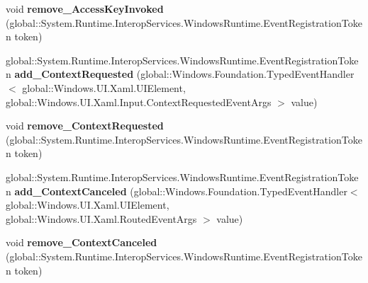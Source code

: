 \begin{DoxyCompactItemize}
\item 
\mbox{\label{interface_windows_1_1_u_i_1_1_xaml_1_1_i_u_i_element4_ae34bf72d8d0d7a9d33ede980ae1b29db}} 
void {\bfseries remove\+\_\+\+Access\+Key\+Invoked} (global\+::\+System.\+Runtime.\+Interop\+Services.\+Windows\+Runtime.\+Event\+Registration\+Token token)
\item 
\mbox{\label{interface_windows_1_1_u_i_1_1_xaml_1_1_i_u_i_element4_abe904f042597f814b0e82b6911018524}} 
global\+::\+System.\+Runtime.\+Interop\+Services.\+Windows\+Runtime.\+Event\+Registration\+Token {\bfseries add\+\_\+\+Context\+Requested} (global\+::\+Windows.\+Foundation.\+Typed\+Event\+Handler$<$ global\+::\+Windows.\+U\+I.\+Xaml.\+U\+I\+Element, global\+::\+Windows.\+U\+I.\+Xaml.\+Input.\+Context\+Requested\+Event\+Args $>$ value)
\item 
\mbox{\label{interface_windows_1_1_u_i_1_1_xaml_1_1_i_u_i_element4_abdaa8213b321663c768808ee50570eb8}} 
void {\bfseries remove\+\_\+\+Context\+Requested} (global\+::\+System.\+Runtime.\+Interop\+Services.\+Windows\+Runtime.\+Event\+Registration\+Token token)
\item 
\mbox{\label{interface_windows_1_1_u_i_1_1_xaml_1_1_i_u_i_element4_a9ade4191c6e4d4e8692b363604d2e6cf}} 
global\+::\+System.\+Runtime.\+Interop\+Services.\+Windows\+Runtime.\+Event\+Registration\+Token {\bfseries add\+\_\+\+Context\+Canceled} (global\+::\+Windows.\+Foundation.\+Typed\+Event\+Handler$<$ global\+::\+Windows.\+U\+I.\+Xaml.\+U\+I\+Element, global\+::\+Windows.\+U\+I.\+Xaml.\+Routed\+Event\+Args $>$ value)
\item 
\mbox{\label{interface_windows_1_1_u_i_1_1_xaml_1_1_i_u_i_element4_ac9d7657d497cc4bd420335a23752824f}} 
void {\bfseries remove\+\_\+\+Context\+Canceled} (global\+::\+System.\+Runtime.\+Interop\+Services.\+Windows\+Runtime.\+Event\+Registration\+Token token)
\item 
\mbox{\label{interface_windows_1_1_u_i_1_1_xaml_1_1_i_u_i_element4_a35fc44f1af8aacfcb2a3ff829fcb7d50}} 

\end{DoxyCompactItemize}

